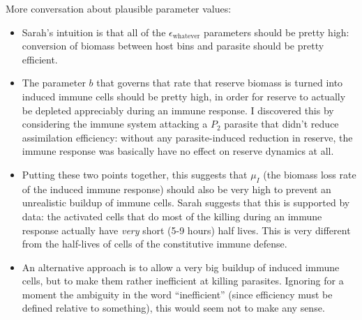 \documentclass[12pt,reqno,final,pdftex]{amsart}\usepackage[]{graphicx}\usepackage[]{color}
\theoremstyle{plain}
\numberwithin{equation}{part}
\begin{document}
More conversation about plausible parameter values:
\begin{itemize}
\item Sarah's intuition is that all of the $\epsilon_{\text{whatever}}$ parameters should be pretty high: conversion of biomass between host bins and parasite should be pretty efficient.
\item The parameter $b$ that governs that rate that reserve biomass is turned into induced immune cells should be pretty high, in order for reserve to actually be depleted appreciably during an immune response. I discovered this by considering the immune system attacking a $P_2$ parasite that didn't reduce assimilation efficiency: without any parasite-induced reduction in reserve, the immune response was basically have no effect on reserve dynamics at all.
\item Putting these two points together, this suggests that $\mu_I$ (the biomass loss rate of the induced immune response) should also be very high to prevent an unrealistic buildup of immune cells. Sarah suggests that this is supported by data: the activated cells that do most of the killing during an immune response actually have \emph{very} short (5-9 hours) half lives. This is very different from the half-lives of cells of the constitutive immune defense.
\item An alternative approach is to allow a very big buildup of induced immune cells, but to make them rather inefficient at killing parasites. Ignoring for a moment the ambiguity in the word ``inefficient'' (since efficiency must be defined relative to something), this would seem not to make any sense.
\end{itemize}
\end{document}
